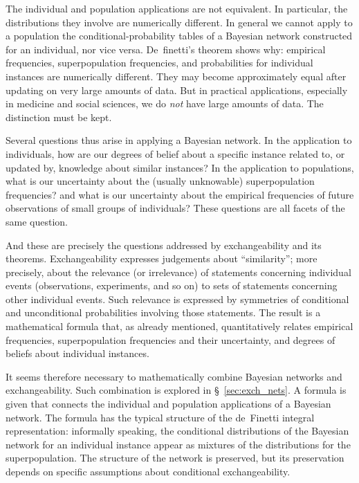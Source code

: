\documentclass[\ifafour a4paper,12pt,\else a5paper,10pt,\fi%
onecolumn,oneside,article,%
british%
]{memoir}
\theoremstyle{remark}
\theoremstyle{innote}
\newcommand*{\p}{\mathrm{P}}%
\renewcommand*{\|}[1][]{\nonscript\,#1\vert\nonscript\,\mathopen{}}
\newcommand*{\sect}{\S}%
\newcommand*{\cf}{{cf.}}
\renewcommand*{\=}{\TextOrMath\texteq\eq}
\newcommand*{\X}[1]{X_{#1}}
\newcommand*{\x}[1]{x_{#1}}
\begin{document}
The individual and population applications are not equivalent. In
particular, the distributions they involve are numerically different. In
general we cannot apply to a population the conditional-probability tables
of a Bayesian network constructed for an individual, nor vice versa.
De~finetti's theorem shows why: empirical frequencies, %
superpopulation frequencies, %
and probabilities for individual instances
are numerically different. They may become approximately equal after
updating on very large amounts of data. But in practical applications,
especially in medicine and social sciences, we do \emph{not} have large
amounts of data. The distinction must be kept.

Several questions thus arise in applying a Bayesian network. In the
application to individuals, how are our %
degrees of belief about a specific instance related to, or updated by,
knowledge about similar instances? In the application to populations, what
is our uncertainty about the (usually unknowable) superpopulation
frequencies? and what is our uncertainty about the empirical frequencies of
future observations of small groups of individuals? These questions are all
facets of the same question.

And these are precisely the questions addressed by exchangeability and its
theorems. Exchangeability expresses judgements about \enquote{similarity};
more precisely, about the relevance (or irrelevance) of statements
concerning individual events (observations, experiments, and so on) to sets
of statements concerning other individual events. Such relevance is
expressed by symmetries of conditional and unconditional probabilities
involving those statements. The result is a mathematical formula that, as
already mentioned, quantitatively relates empirical frequencies,
superpopulation frequencies and their uncertainty, and degrees of beliefs
about individual instances.

It seems therefore necessary to mathematically combine Bayesian networks
and exchangeability. Such combination is explored in
\sect~\ref{sec:exch_nets}. A formula is given that connects the individual
and population applications of a Bayesian network. The formula has the
typical structure of the de~Finetti integral representation: informally
speaking, the conditional distributions of the Bayesian network for an
individual instance appear as mixtures of the distributions for the
superpopulation. The structure of the network is preserved, but its
preservation depends on specific assumptions about conditional
exchangeability.
\end{document}
